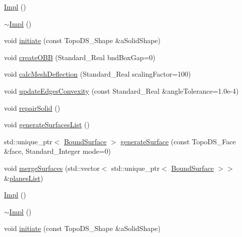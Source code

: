 \begin{DoxyCompactItemize}
\item 
\hyperlink{classMcCAD_1_1Geometry_1_1Solid_1_1Impl_a0e6034dcecdd2804371ed09fef697e3d}{Impl} ()
\item 
\hyperlink{classMcCAD_1_1Geometry_1_1Solid_1_1Impl_af55a998db65d4bda9732591cd7c4e5ee}{$\sim$\+Impl} ()
\item 
void \hyperlink{classMcCAD_1_1Geometry_1_1Solid_1_1Impl_a2f57c8ff307a31cf90fa29cebf14ff3f}{initiate} (const Topo\+D\+S\+\_\+\+Shape \&a\+Solid\+Shape)
\item 
void \hyperlink{classMcCAD_1_1Geometry_1_1Solid_1_1Impl_ad4e11c64ad4fff42e3ad2d9fb955c6d7}{create\+O\+BB} (Standard\+\_\+\+Real bnd\+Box\+Gap=0)
\item 
void \hyperlink{classMcCAD_1_1Geometry_1_1Solid_1_1Impl_a0ef5f0f364356801915a7bc7a38a02ff}{calc\+Mesh\+Deflection} (Standard\+\_\+\+Real scaling\+Factor=100)
\item 
void \hyperlink{classMcCAD_1_1Geometry_1_1Solid_1_1Impl_a120c6cee4bc3e3d3fb9bd9f12d163c69}{update\+Edges\+Convexity} (const Standard\+\_\+\+Real \&angle\+Tolerance=1.\+0e-\/4)
\item 
void \hyperlink{classMcCAD_1_1Geometry_1_1Solid_1_1Impl_a095d0c53eb4095cee9b643fe1b1f5671}{repair\+Solid} ()
\item 
void \hyperlink{classMcCAD_1_1Geometry_1_1Solid_1_1Impl_a9031d6cc6e8a87cf4e49bc768fe88128}{generate\+Surfaces\+List} ()
\item 
std\+::unique\+\_\+ptr$<$ \hyperlink{classMcCAD_1_1Geometry_1_1BoundSurface}{Bound\+Surface} $>$ \hyperlink{classMcCAD_1_1Geometry_1_1Solid_1_1Impl_ac4e7efed489a9be21162676c6dff0b6b}{generate\+Surface} (const Topo\+D\+S\+\_\+\+Face \&face, Standard\+\_\+\+Integer mode=0)
\item 
void \hyperlink{classMcCAD_1_1Geometry_1_1Solid_1_1Impl_a7f434941fa38e84186ebb026342984c8}{merge\+Surfaces} (std\+::vector$<$ std\+::unique\+\_\+ptr$<$ \hyperlink{classMcCAD_1_1Geometry_1_1BoundSurface}{Bound\+Surface} $>$$>$ \&\hyperlink{classMcCAD_1_1Geometry_1_1Solid_1_1Impl_a5b4fb46f10895ab3f6fe12243f317ef6}{planes\+List})
\item 
\hyperlink{classMcCAD_1_1Geometry_1_1Solid_1_1Impl_a0e6034dcecdd2804371ed09fef697e3d}{Impl} ()
\item 
\hyperlink{classMcCAD_1_1Geometry_1_1Solid_1_1Impl_af55a998db65d4bda9732591cd7c4e5ee}{$\sim$\+Impl} ()
\item 
void \hyperlink{classMcCAD_1_1Geometry_1_1Solid_1_1Impl_a2f57c8ff307a31cf90fa29cebf14ff3f}{initiate} (const Topo\+D\+S\+\_\+\+Shape \&a\+Solid\+Shape)
$$
\end{DoxyCompactItemize}
